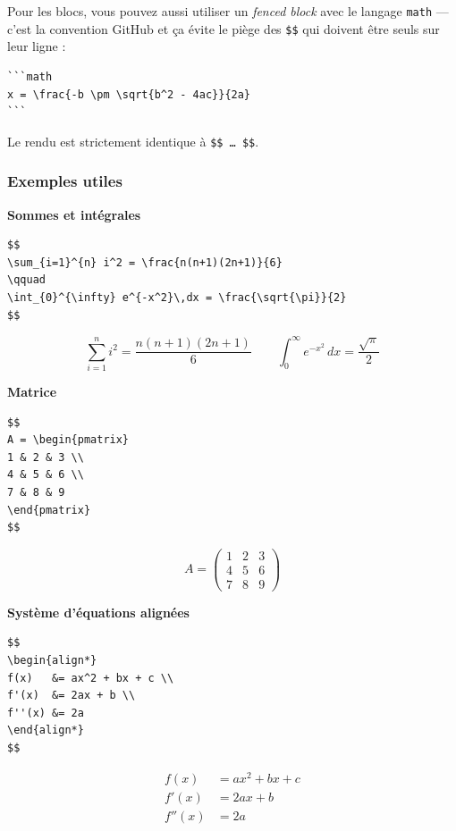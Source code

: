 \documentclass[11pt,a4paper]{article}
\theoremstyle{definition}
\begin{document}
Pour les blocs, vous pouvez aussi utiliser un \emph{fenced block} avec le
langage \texttt{math} — c'est la convention GitHub et ça évite le piège des
\texttt{\$\$} qui doivent être seuls sur leur ligne :


\begin{lstlisting}
```math
x = \frac{-b \pm \sqrt{b^2 - 4ac}}{2a}
```
\end{lstlisting}


Le rendu est strictement identique à \texttt{\$\$ … \$\$}.


\subsubsection{Exemples utiles}

\textbf{Sommes et intégrales}


\begin{lstlisting}
$$
\sum_{i=1}^{n} i^2 = \frac{n(n+1)(2n+1)}{6}
\qquad
\int_{0}^{\infty} e^{-x^2}\,dx = \frac{\sqrt{\pi}}{2}
$$
\end{lstlisting}


\[
\sum_{i=1}^{n} i^2 = \frac{n(n+1)(2n+1)}{6}
\qquad
\int_{0}^{\infty} e^{-x^2}\,dx = \frac{\sqrt{\pi}}{2}
\]


\textbf{Matrice}


\begin{lstlisting}
$$
A = \begin{pmatrix}
1 & 2 & 3 \\
4 & 5 & 6 \\
7 & 8 & 9
\end{pmatrix}
$$
\end{lstlisting}


\[
A = \begin{pmatrix}
1 & 2 & 3 \\
4 & 5 & 6 \\
7 & 8 & 9
\end{pmatrix}
\]


\textbf{Système d'équations alignées}


\begin{lstlisting}
$$
\begin{align*}
f(x)   &= ax^2 + bx + c \\
f'(x)  &= 2ax + b \\
f''(x) &= 2a
\end{align*}
$$
\end{lstlisting}


\begin{align*}
f(x)   &= ax^2 + bx + c \\
f'(x)  &= 2ax + b \\
f''(x) &= 2a
\end{align*}
\end{document}

